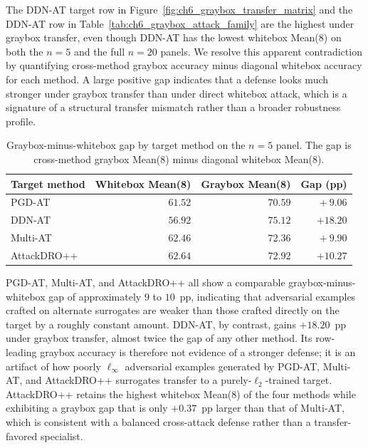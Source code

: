 The DDN-AT target row in Figure~\ref{fig:ch6_graybox_transfer_matrix} and
the DDN-AT row in Table~\ref{tab:ch6_graybox_attack_family} are the highest
under graybox transfer,
even though DDN-AT has the lowest whitebox Mean(8) on both the $n=5$ and
the full $n=20$ panels. We resolve this apparent contradiction by
quantifying cross-method graybox accuracy minus diagonal whitebox accuracy
for each method. A large positive gap indicates that a defense looks
much stronger under graybox transfer than under direct whitebox attack,
which is a signature of a structural transfer mismatch rather than a
broader robustness profile.

\begin{table}[H]
\centering
\caption[Graybox-whitebox gap by method]{Graybox-minus-whitebox gap by target method on the \(n=5\) panel.
The gap is cross-method graybox Mean(8) minus diagonal whitebox Mean(8).}
\label{tab:ch6_graybox_gap}
\small
\setlength{\tabcolsep}{8pt}
\renewcommand{\arraystretch}{1.08}
\begin{tabular}{lrrr}
\toprule
Target method     & Whitebox Mean(8) & Graybox Mean(8) & Gap (pp) \\
\midrule
PGD-AT & $61.52$ & $70.59$ & $\phantom{0}+9.06$  \\
DDN-AT      & $56.92$ & $75.12$ & $+18.20$   \\
Multi-AT  & $62.46$ & $72.36$ & $\phantom{0}+9.90$  \\
AttackDRO++ & $62.64$ & $72.92$ & $+10.27$   \\
\bottomrule
\end{tabular}
\end{table}

PGD-AT, Multi-AT, and AttackDRO++ all show a comparable
graybox-minus-whitebox gap of approximately $9$ to $10$~pp, indicating that
adversarial examples crafted on alternate surrogates are weaker than
those crafted directly on the target by a roughly constant amount.
DDN-AT, by contrast, gains $+18.20$~pp under graybox transfer, almost
twice the gap of any other method. Its row-leading graybox accuracy is therefore not evidence of a stronger defense; it is an artifact of
how poorly $\ell_\infty$ adversarial examples generated by PGD-AT, Multi-AT, and AttackDRO++ surrogates transfer to a
purely-$\ell_2$-trained target. AttackDRO++ retains the highest whitebox
Mean(8) of the four methods while exhibiting a graybox gap that is only
$+0.37$~pp larger than that of Multi-AT, which is consistent with a
balanced cross-attack defense rather than a transfer-favored
specialist.


